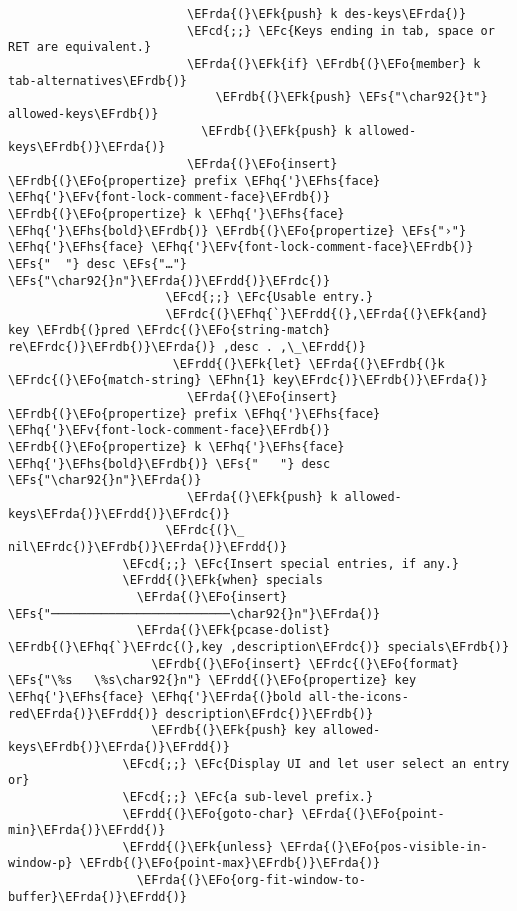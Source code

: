 \documentclass[c]{article}
\theoremstyle{plain}%
\theoremstyle{definition}
\theoremstyle{remark}
\newcommand{\EFc}[1]{\textcolor{EFc}{#1}} %
\newcommand{\EFcd}[1]{\textcolor{EFcd}{#1}} %
\newcommand{\EFs}[1]{\textcolor{EFs}{#1}} %
\newcommand{\EFk}[1]{\textcolor{EFk}{#1}} %
\newcommand{\EFv}[1]{\textcolor{EFv}{#1}} %
\newcommand{\EFo}[1]{\textcolor{EFo}{#1}} %
\newcommand{\EFhn}[1]{\textcolor{EFhn}{\textbf{#1}}} %
\newcommand{\EFhq}[1]{\textcolor{EFhq}{#1}} %
\newcommand{\EFhs}[1]{\textcolor{EFhs}{#1}} %
\newcommand{\EFrda}[1]{\textcolor{EFrda}{#1}} %
\newcommand{\EFrdb}[1]{\textcolor{EFrdb}{#1}} %
\newcommand{\EFrdc}[1]{\textcolor{EFrdc}{#1}} %
\newcommand{\EFrdd}[1]{\textcolor{EFrdd}{#1}} %
\begin{document}
\begin{Code}
\begin{Verbatim}
                         \EFrda{(}\EFk{push} k des-keys\EFrda{)}
                         \EFcd{;;} \EFc{Keys ending in tab, space or RET are equivalent.}
                         \EFrda{(}\EFk{if} \EFrdb{(}\EFo{member} k tab-alternatives\EFrdb{)}
                             \EFrdb{(}\EFk{push} \EFs{"\char92{}t"} allowed-keys\EFrdb{)}
                           \EFrdb{(}\EFk{push} k allowed-keys\EFrdb{)}\EFrda{)}
                         \EFrda{(}\EFo{insert} \EFrdb{(}\EFo{propertize} prefix \EFhq{'}\EFhs{face} \EFhq{'}\EFv{font-lock-comment-face}\EFrdb{)} \EFrdb{(}\EFo{propertize} k \EFhq{'}\EFhs{face} \EFhq{'}\EFhs{bold}\EFrdb{)} \EFrdb{(}\EFo{propertize} \EFs{"›"} \EFhq{'}\EFhs{face} \EFhq{'}\EFv{font-lock-comment-face}\EFrdb{)} \EFs{"  "} desc \EFs{"…"} \EFs{"\char92{}n"}\EFrda{)}\EFrdd{)}\EFrdc{)}
                      \EFcd{;;} \EFc{Usable entry.}
                      \EFrdc{(}\EFhq{`}\EFrdd{(},\EFrda{(}\EFk{and} key \EFrdb{(}pred \EFrdc{(}\EFo{string-match} re\EFrdc{)}\EFrdb{)}\EFrda{)} ,desc . ,\_\EFrdd{)}
                       \EFrdd{(}\EFk{let} \EFrda{(}\EFrdb{(}k \EFrdc{(}\EFo{match-string} \EFhn{1} key\EFrdc{)}\EFrdb{)}\EFrda{)}
                         \EFrda{(}\EFo{insert} \EFrdb{(}\EFo{propertize} prefix \EFhq{'}\EFhs{face} \EFhq{'}\EFv{font-lock-comment-face}\EFrdb{)} \EFrdb{(}\EFo{propertize} k \EFhq{'}\EFhs{face} \EFhq{'}\EFhs{bold}\EFrdb{)} \EFs{"   "} desc \EFs{"\char92{}n"}\EFrda{)}
                         \EFrda{(}\EFk{push} k allowed-keys\EFrda{)}\EFrdd{)}\EFrdc{)}
                      \EFrdc{(}\_ nil\EFrdc{)}\EFrdb{)}\EFrda{)}\EFrdd{)}
                \EFcd{;;} \EFc{Insert special entries, if any.}
                \EFrdd{(}\EFk{when} specials
                  \EFrda{(}\EFo{insert} \EFs{"─────────────────────────\char92{}n"}\EFrda{)}
                  \EFrda{(}\EFk{pcase-dolist} \EFrdb{(}\EFhq{`}\EFrdc{(},key ,description\EFrdc{)} specials\EFrdb{)}
                    \EFrdb{(}\EFo{insert} \EFrdc{(}\EFo{format} \EFs{"\%s   \%s\char92{}n"} \EFrdd{(}\EFo{propertize} key \EFhq{'}\EFhs{face} \EFhq{'}\EFrda{(}bold all-the-icons-red\EFrda{)}\EFrdd{)} description\EFrdc{)}\EFrdb{)}
                    \EFrdb{(}\EFk{push} key allowed-keys\EFrdb{)}\EFrda{)}\EFrdd{)}
                \EFcd{;;} \EFc{Display UI and let user select an entry or}
                \EFcd{;;} \EFc{a sub-level prefix.}
                \EFrdd{(}\EFo{goto-char} \EFrda{(}\EFo{point-min}\EFrda{)}\EFrdd{)}
                \EFrdd{(}\EFk{unless} \EFrda{(}\EFo{pos-visible-in-window-p} \EFrdb{(}\EFo{point-max}\EFrdb{)}\EFrda{)}
                  \EFrda{(}\EFo{org-fit-window-to-buffer}\EFrda{)}\EFrdd{)}

\end{Verbatim}
\end{Code}
\end{document}
